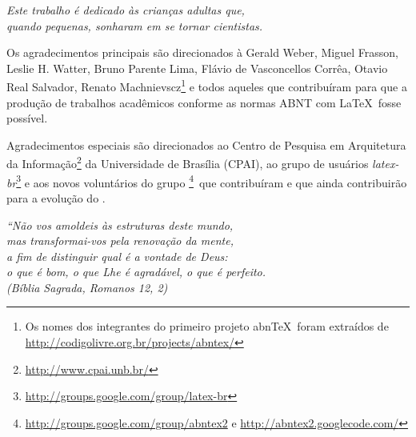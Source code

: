 \documentclass[
	12pt,				%
	openright,			%
	oneside,			%
	a4paper,			%
	english,			%
	brazil				%
	]{dissertacao-ufrgs-abntex2}
\begin{document}
\begin{dedicatoria}
   \vspace*{\fill}
   \centering
   \noindent
   \textit{ Este trabalho é dedicado às crianças adultas que,\\
   quando pequenas, sonharam em se tornar cientistas.} \vspace*{\fill}
\end{dedicatoria}

\begin{agradecimentos}
Os agradecimentos principais são direcionados à Gerald Weber, Miguel Frasson,
Leslie H. Watter, Bruno Parente Lima, Flávio de Vasconcellos Corrêa, Otavio Real
Salvador, Renato Machnievscz\footnote{Os nomes dos integrantes do primeiro
projeto abn\TeX\ foram extraídos de
\url{http://codigolivre.org.br/projects/abntex/}} e todos aqueles que
contribuíram para que a produção de trabalhos acadêmicos conforme
as normas ABNT com \LaTeX\ fosse possível.

Agradecimentos especiais são direcionados ao Centro de Pesquisa em Arquitetura
da Informação\footnote{\url{http://www.cpai.unb.br/}} da Universidade de
Brasília (CPAI), ao grupo de usuários
\emph{latex-br}\footnote{\url{http://groups.google.com/group/latex-br}} e aos
novos voluntários do grupo
\emph{\abnTeX}\footnote{\url{http://groups.google.com/group/abntex2} e
\url{http://abntex2.googlecode.com/}}~que contribuíram e que ainda
contribuirão para a evolução do \abnTeX.

\end{agradecimentos}

\begin{epigrafe}
    \vspace*{\fill}
	\begin{flushright}
		\textit{``Não vos amoldeis às estruturas deste mundo, \\
		mas transformai-vos pela renovação da mente, \\
		a fim de distinguir qual é a vontade de Deus: \\
		o que é bom, o que Lhe é agradável, o que é perfeito.\\
		(Bíblia Sagrada, Romanos 12, 2)}
	\end{flushright}
\end{epigrafe}

\end{document}

